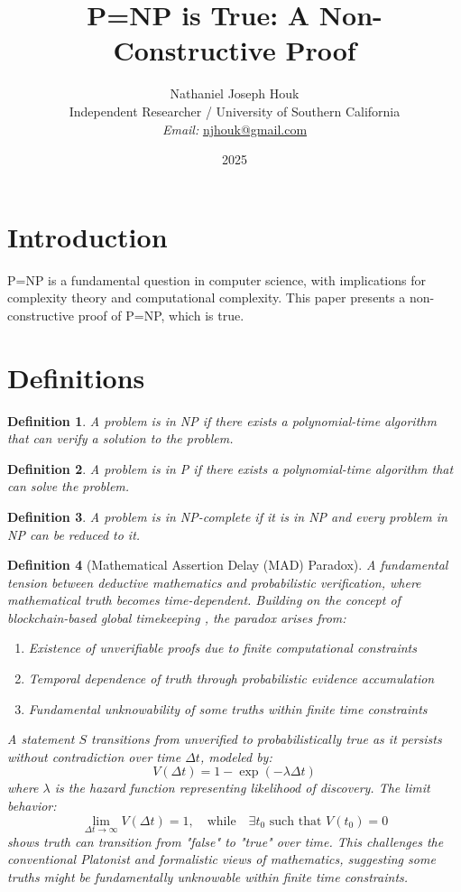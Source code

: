 \documentclass{article}
\title{P=NP is True: A Non-Constructive Proof}
\author{Nathaniel Joseph Houk\\
Independent Researcher / University of Southern California\\
\textit{Email:} \href{mailto:njhouk@gmail.com}{njhouk@gmail.com}}
\date{2025}
\newtheorem{definition}{Definition}
\begin{document}
\maketitle

\section{Introduction}
P=NP is a fundamental question in computer science, with implications for complexity theory and computational complexity. This paper presents a non-constructive proof of P=NP, which is true.

\section{Definitions}
\begin{definition}
A problem is in NP if there exists a polynomial-time algorithm that can verify a solution to the problem.
\end{definition}

\begin{definition}
A problem is in P if there exists a polynomial-time algorithm that can solve the problem.
\end{definition}

\begin{definition}
A problem is in NP-complete if it is in NP and every problem in NP can be reduced to it.
\end{definition}

\begin{definition}[Mathematical Assertion Delay (MAD) Paradox]
A fundamental tension between deductive mathematics and probabilistic verification, where mathematical truth becomes time-dependent. Building on the concept of blockchain-based global timekeeping \cite{Houk2024Timezones}, the paradox arises from:
\begin{enumerate}
    \item Existence of unverifiable proofs due to finite computational constraints
    \item Temporal dependence of truth through probabilistic evidence accumulation
    \item Fundamental unknowability of some truths within finite time constraints
\end{enumerate}
A statement $S$ transitions from unverified to probabilistically true as it persists without contradiction over time $\Delta t$, modeled by:
\[
V(\Delta t) = 1 - \exp\left(-\lambda \Delta t\right)
\]
where $\lambda$ is the hazard function representing likelihood of discovery. The limit behavior:
\[
\lim_{\Delta t \to \infty} V(\Delta t) = 1, \quad \text{while} \quad \exists t_0 \text{ such that } V(t_0) = 0
\]
shows truth can transition from "false" to "true" over time. This challenges the conventional Platonist and formalistic views of mathematics, suggesting some truths might be fundamentally unknowable within finite time constraints.
\end{definition}
\end{document}
